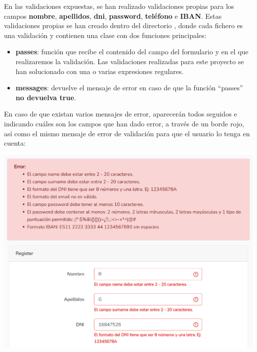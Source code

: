 \documentclass{\ClassPath/viu-tfm-template}
\begin{document}
\hypertarget{validator}{}

En las validaciones expuestas, se han realizado validaciones propias para los campos \textbf{nombre}, \textbf{apellidos}, \textbf{dni}, \textbf{password}, \textbf{teléfono} e \textbf{IBAN}. Estas validaciones propias se han creado dentro del directorio , donde cada fichero es una validación y contienen una clase con dos funciones principales:

\begin{itemize}
    \item \textbf{passes}: función que recibe el contenido del campo del formulario y en el que realizaremos la validación. Las validaciones realizadas para este proyecto se han solucionado con una o varias expresiones regulares.

    \item \textbf{messages}: devuelve el mensaje de error en caso de que la función “passes” \textbf{no devuelva true}.
\end{itemize}

En caso de que existan varios mensajes de error, aparecerán todos seguidos e indicando cuáles son los campos que han dado error, a través de un borde rojo, así como el mismo mensaje de error de validación para que el usuario lo tenga en cuenta:

\begin{center}
    \includegraphics[frame,width=0.8\linewidth]{img/errores.png}
\end{center}
\end{document}

